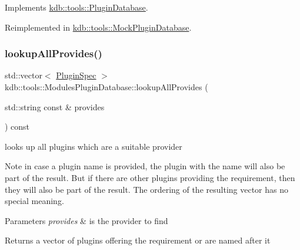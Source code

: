 Implements \hyperlink{classkdb_1_1tools_1_1PluginDatabase_adc1f43ccefdd7fc15a57db7571420642}{kdb\+::tools\+::\+Plugin\+Database}.



Reimplemented in \hyperlink{classkdb_1_1tools_1_1MockPluginDatabase_a3663848683953bfad7123c48c00ab404}{kdb\+::tools\+::\+Mock\+Plugin\+Database}.

\mbox{\label{classkdb_1_1tools_1_1ModulesPluginDatabase_a306384e88f9cf2874f6ba9ce28973a26}} 
\subsubsection{\texorpdfstring{lookup\+All\+Provides()}{lookupAllProvides()}}
{\footnotesize\ttfamily std\+::vector$<$ \hyperlink{classkdb_1_1tools_1_1PluginSpec}{Plugin\+Spec} $>$ kdb\+::tools\+::\+Modules\+Plugin\+Database\+::lookup\+All\+Provides (\begin{DoxyParamCaption}\item[{std\+::string const \&}]{provides }\end{DoxyParamCaption}) const\hspace{0.3cm}{\ttfamily [virtual]}}



looks up all plugins which are a suitable provider 

\begin{DoxyNote}{Note}
in case a plugin name is provided, the plugin with the name will also be part of the result. But if there are other plugins providing the requirement, then they will also be part of the result. The ordering of the resulting vector has no special meaning.
\end{DoxyNote}

\begin{DoxyParams}{Parameters}
{\em provides} & is the provider to find\\
\hline
\end{DoxyParams}
\begin{DoxyReturn}{Returns}
a vector of plugins offering the requirement or are named after it 
\end{DoxyReturn}


